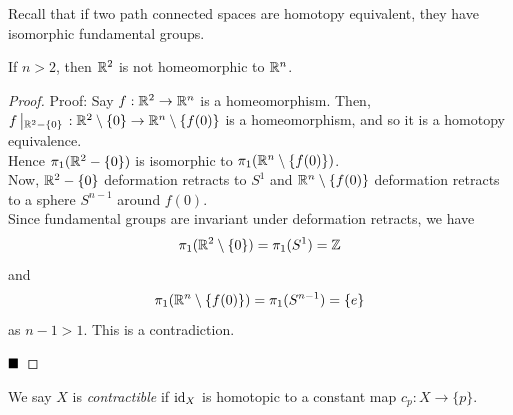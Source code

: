 
Recall that if two path connected spaces are homotopy equivalent, they have isomorphic fundamental groups.

\begin{lemma}
    If $n > 2$, then $\mathbb{R}^2$ is not homeomorphic to $\mathbb{R}^n$.
\end{lemma}
\begin{proof}{Proof:}
    Say $f : \mathbb{R}^2 \to \mathbb{R}^n$ is a homeomorphism. Then, $f\left|_{\mathbb{R}^2 - \{0\}}\right. : \mathbb{R}^2 \setminus \{0\} \to \mathbb{R}^n \setminus \{f(0)\}$ is a homeomorphism, and so it is a homotopy equivalence.\\

    Hence $\pi_1(\mathbb{R}^2 - \{0\})$ is isomorphic to $\pi_1(\mathbb{R}^n \setminus \{f(0)\})$.\\

    Now, $\mathbb{R}^2 - \{0\}$ deformation retracts to $S^1$ and $\mathbb{R}^n \setminus \{f(0)\}$ deformation retracts to a sphere $S^{n - 1}$ around $f(0)$.\\

    Since fundamental groups are invariant under deformation retracts, we have
    \[ \pi_1(\mathbb{R}^2 \setminus \{0\}) = \pi_1(S^1) = \mathbb{Z} \]
    and
    \[ \pi_1(\mathbb{R}^n \setminus \{f(0)\}) = \pi_1(S^{n - 1}) = \{e\} \]
    as $n - 1 > 1$. This is a contradiction.

    $\qed$
\end{proof}

\begin{definition}
    We say $X$ is \emph{contractible} if $\text{id}_X$ is homotopic to a constant map $c_p : X \to \{p\}$.
\end{definition}

